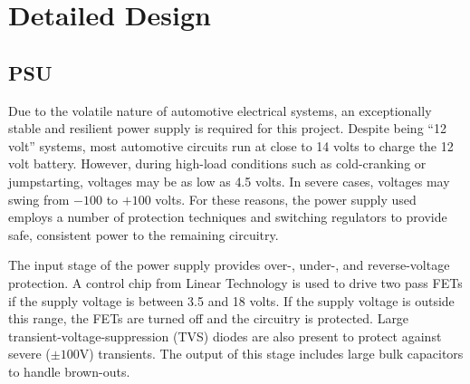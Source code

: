 \chapter{Detailed Design}
\label{chap:detailed-design}




\section{PSU}
Due to the volatile nature of automotive electrical systems, an exceptionally stable and 
resilient power supply is required for this project.  Despite being ``12 volt''
systems, most automotive circuits run at close to 14 volts to charge the 12
volt battery.  However, during high-load conditions such as cold-cranking or
jumpstarting, voltages may be as low as 4.5 volts.  In severe cases, voltages
may swing from $-100$ to $+100$ volts.  For these reasons, the power supply used
employs a number of protection techniques and switching regulators to provide
safe, consistent power to the remaining circuitry.

The input stage of the power supply provides over-, under-, and reverse-voltage
protection.  A control chip from Linear Technology \cite{ltc4365ds} is used to drive two pass
FETs if the supply voltage is between 3.5 and 18 volts.  If the supply voltage
is outside this range, the FETs are turned off and the circuitry is
protected.  Large transient-voltage-suppression (TVS) diodes are also present to
protect against severe ($\pm 100$V) transients.  The output of this stage includes
large bulk capacitors to handle brown-outs.

